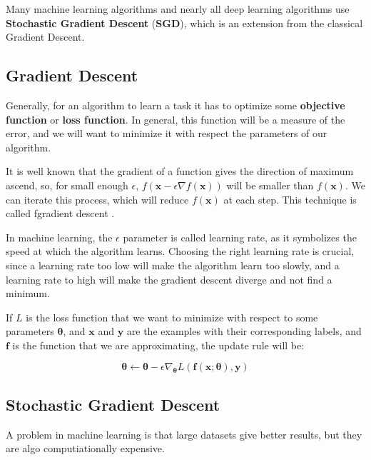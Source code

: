 Many machine learning algorithms and nearly all deep learning algorithms use \textbf{Stochastic Gradient Descent} (\textbf{SGD}), which is an extension from the classical Gradient Descent. 

\subsection{Gradient Descent}

Generally, for an algorithm to learn a task it has to optimize some \textbf{objective function} or \textbf{loss function}. In general, this function will be a measure of the error, and we will want to minimize it with respect the parameters of our algorithm.

It is well known that the gradient of a function gives the direction of maximum ascend, so, for small enough \(\epsilon\), \(f(\bm{x} - \epsilon\nabla f(\bm{x}))\) will be smaller than \(f(\bm{x})\). We can iterate this process, which will reduce \(f(\bm{x})\) at each step. This technique is called fgradient descent \parencite{cauchy1847methode}.

In machine learning, the \(\epsilon\) parameter is called learning rate, as it symbolizes the speed at which the algorithm learns. Choosing the right learning rate is crucial, since a learning rate too low will make the algorithm learn too slowly, and a learning rate to high will make the gradient descent diverge and not find a minimum.

If \(L\) is the loss function that we want to minimize with respect to some parameters \(\bm{\theta}\), and \(\bm{x}\) and \(\bm{y}\) are the examples with their corresponding labels, and \(\bm{f}\) is the function that we are approximating, the update rule will be:

\begin{equation}
\bm{\theta} \leftarrow \bm{\theta} - \epsilon \nabla_{\bm{\theta}} L\left(\bm{f}(\bm{x};\bm{\theta}),\bm{y}\right)
\end{equation}

\subsection{Stochastic Gradient Descent}

A problem in machine learning is that large datasets give better results, but they are algo computiationally expensive.

